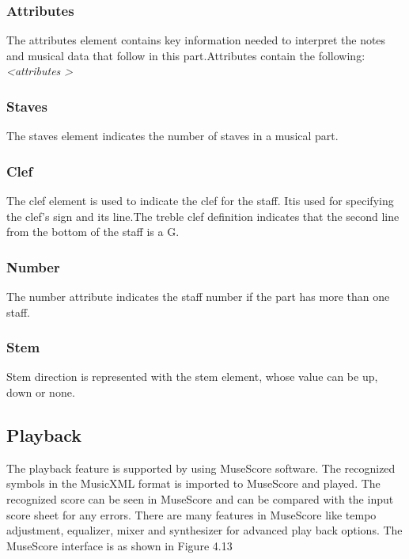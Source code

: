 \documentclass[journal]{IEEEtran}
\begin{document}
\subsubsection{Attributes}
The attributes element contains key information needed to interpret the notes and musical data
that follow in this part.Attributes contain the following:
\textit{ \textless  attributes \textgreater } 

\subsubsection{ Staves}
The staves element indicates the number of staves in a musical part.

\subsubsection{Clef}
The clef element is used to indicate the clef for the staff. Itis used for specifying the clef’s sign
and its line.The treble clef definition indicates that the second line from the bottom of the staff is a G.

\subsubsection{Number}
The number attribute indicates the staff number if the part has more than one staff.

\subsubsection{Stem}
Stem direction is represented with the stem element, whose value can be up, down or none.

\subsection{Playback}
The playback feature is supported by using MuseScore software. The recognized symbols in
the MusicXML format is imported to MuseScore and played. The recognized score can be seen
in MuseScore and can be compared with the input score sheet for any errors. There are many
features in MuseScore like tempo adjustment, equalizer, mixer and synthesizer for advanced play
back options. The MuseScore interface is as shown in Figure 4.13

\end{document}
